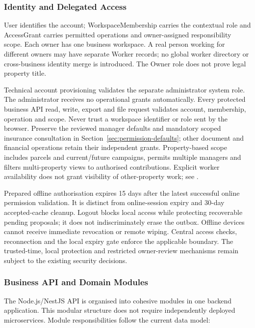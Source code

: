 \subsubsection{Identity and Delegated Access}
User identifies the account; WorkspaceMembership carries the contextual role and
AccessGrant carries permitted operations and owner-assigned responsibility scope.
Each owner has one business workspace. A real person working for different owners
may have separate Worker records; no global worker directory or cross-business
identity merge is introduced. The Owner role does not prove legal property title.

Technical account provisioning validates the separate administrator system role.
The administrator receives no operational grants automatically. Every protected
business API read, write, export and file request validates account, membership, operation and scope. Never trust a workspace identifier or role sent
by the browser. Preserve the reviewed manager defaults and mandatory scoped
insurance consultation in Section~\ref{sec:permission-defaults}; other document
and financial operations retain their independent grants. Property-based scope
includes parcels and current/future campaigns, permits multiple managers and
filters multi-property views to authorised contributions. Explicit worker
availability does not grant visibility of other-property work; see
.

Prepared offline authorisation expires 15 days after the latest successful online
permission validation. It is distinct from online-session expiry and 30-day
accepted-cache cleanup. Logout blocks local access while protecting recoverable
pending proposals; it does not indiscriminately erase the outbox. Offline devices
cannot receive immediate revocation or remote wiping. Central access checks,
reconnection and the local expiry gate enforce the applicable boundary. The
trusted-time, local protection and restricted owner-review mechanisms remain
subject to the existing security decisions.

\subsubsection{Business API and Domain Modules}
The Node.js/NestJS API is organised into cohesive modules in one backend
application. This modular structure does not require independently deployed
microservices. Module responsibilities follow the current data model:

